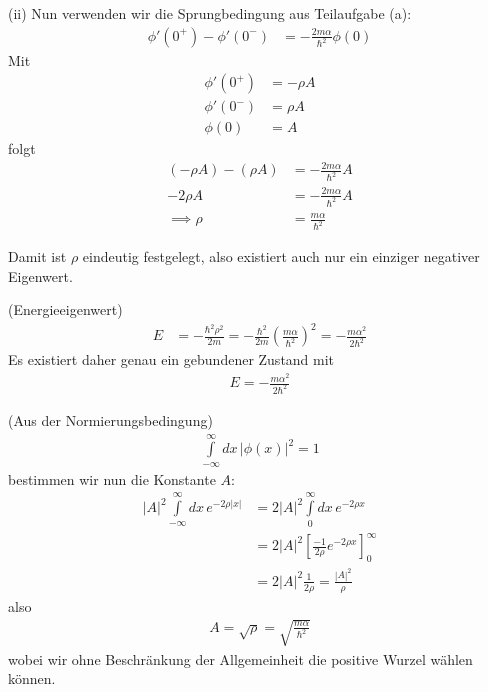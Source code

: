 \documentclass[11pt,a4paper]{scrartcl}
\begin{document}
\begin{enumerate}[label=(\alph*)]
\begin{tcolorbox}[title=Berechnung, breakable]
        (ii) Nun verwenden wir die Sprungbedingung aus Teilaufgabe (a):
        \begin{align*}
            \phi'(0^+) - \phi'(0^-) &= -\frac{2 m \alpha}{\hbar^2} \phi(0)
        \end{align*}
        Mit
        \begin{align*}
            \phi'(0^+) &= - \rho A\\
            \phi'(0^-) &= \rho A\\
            \phi(0) &= A
        \end{align*}
        folgt
        \begin{align*}
            (- \rho A) - (\rho A) &= -\frac{2 m \alpha}{\hbar^2} A\\
            -2\rho A &= -\frac{2 m \alpha}{\hbar^2} A\\
            \implies  \rho &= \frac{m \alpha}{\hbar^2}
        \end{align*}

        Damit ist $\rho$ eindeutig festgelegt, also existiert auch nur ein einziger negativer Eigenwert.

        (Energieeigenwert)
        \begin{align*}
            E &= -\frac{\hbar^2\rho^2}{2m}
            = -\frac{\hbar^2}{2m} \left(\frac{m\alpha}{\hbar^2}\right)^2
            = -\frac{m\alpha^2}{2\hbar^2}
        \end{align*}
        Es existiert daher genau ein gebundener Zustand mit
        \begin{align*}
            E = -\frac{m\alpha^2}{2\hbar^2}
        \end{align*}

        (Aus der Normierungsbedingung)
        \begin{align*}
            \int\limits_{-\infty}^\infty dx\,|\phi(x)|^2 = 1
        \end{align*}
        bestimmen wir nun die Konstante $A$:
        \begin{align*}
            |A|^2 \int\limits_{-\infty}^\infty dx\,e^{-2\rho|x|}
            &= 2|A|^2 \int\limits_0^\infty dx\,e^{-2\rho x}\\
            &= 2 |A|^2 \left[\frac{-1}{2\rho}e^{-2\rho x}\right]_0^\infty\\
            &= 2|A|^2 \frac{1}{2\rho}
            = \frac{|A|^2}{\rho}
        \end{align*}
        also
        \begin{align*}
            A = \sqrt{\rho} = \sqrt{\frac{m\alpha}{\hbar^2}}
        \end{align*}
        wobei wir ohne Beschränkung der Allgemeinheit die positive Wurzel wählen können.


\end{tcolorbox}
\end{enumerate}
\end{document}
